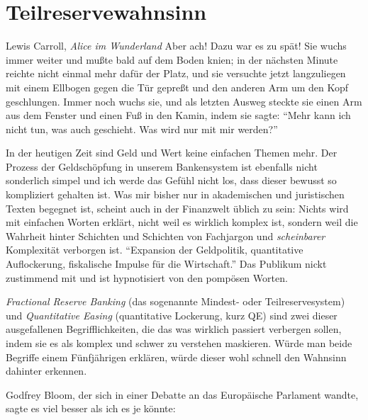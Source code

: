 \chapter{Teilreservewahnsinn}
\label{les:13}

\begin{chapquote}{Lewis Carroll, \textit{Alice im Wunderland}}
Aber ach! Dazu war es zu spät! Sie wuchs immer weiter und mußte bald auf dem
Boden knien; in der nächsten Minute reichte nicht einmal mehr dafür der Platz,
und sie versuchte jetzt langzuliegen mit einem Ellbogen gegen die Tür gepreßt
und den anderen Arm um den Kopf geschlungen. Immer noch wuchs sie, und als
letzten Ausweg steckte sie einen Arm aus dem Fenster und einen Fuß in den Kamin,
indem sie sagte: \enquote{Mehr kann ich nicht tun, was auch geschieht. Was wird
nur mit mir werden?}
\end{chapquote}

In der heutigen Zeit sind Geld und Wert keine einfachen Themen mehr. Der Prozess
der Geldschöpfung in unserem Bankensystem ist ebenfalls nicht sonderlich simpel
und ich werde das Gefühl nicht los, dass dieser bewusst so kompliziert gehalten
ist. Was mir bisher nur in akademischen und juristischen Texten begegnet ist,
scheint auch in der Finanzwelt üblich zu sein: Nichts wird mit einfachen Worten
erklärt, nicht weil es wirklich komplex ist, sondern weil die Wahrheit hinter
Schichten und Schichten von Fachjargon und \textit{scheinbarer} Komplexität
verborgen ist. \enquote{Expansion der Geldpolitik, quantitative Auflockerung,
fiskalische Impulse für die Wirtschaft.} Das Publikum nickt zustimmend mit und
ist hypnotisiert von den pompösen Worten.

\textit{Fractional Reserve Banking} (das sogenannte Mindest- oder
Teilreservesystem) und \textit{Quantitative Easing} (quantitative Lockerung,
kurz QE) sind zwei dieser ausgefallenen Begrifflichkeiten, die das was wirklich
passiert verbergen sollen, indem sie es als komplex und schwer zu verstehen
maskieren. Würde man beide Begriffe einem Fünfjährigen erklären, würde dieser
wohl schnell den Wahnsinn dahinter erkennen.

Godfrey Bloom, der sich in einer Debatte an das Europäische Parlament wandte,
sagte es viel besser als ich es je könnte:

